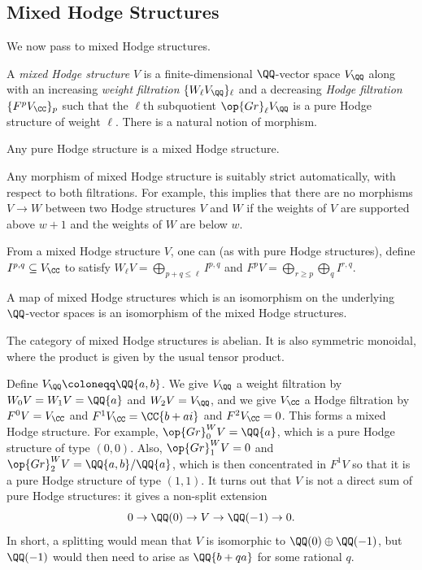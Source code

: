 \documentclass{article}
\begin{document}
\subsection{Mixed Hodge Structures}
We now pass to mixed Hodge structures.
\begin{definition}
	A \textit{mixed Hodge structure} $V$ is a finite-dimensional $\QQ$-vector space $V_\QQ$ along with an increasing \textit{weight filtration} $\{W_\ell V_\QQ\}_\ell$ and a decreasing \textit{Hodge filtration} $\{F^pV_\CC\}_p$ such that the $\ell$th subquotient $\op{Gr}_\ell V_\QQ$ is a pure Hodge structure of weight $\ell$. There is a natural notion of morphism.
\end{definition}
\begin{example}
	Any pure Hodge structure is a mixed Hodge structure.
\end{example}
\begin{remark}
	Any morphism of mixed Hodge structure is suitably strict automatically, with respect to both filtrations. For example, this implies that there are no morphisms $V\to W$ between two Hodge structures $V$ and $W$ if the weights of $V$ are supported above $w+1$ and the weights of $W$ are below $w$.
\end{remark}
\begin{remark}
	From a mixed Hodge structure $V$, one can (as with pure Hodge structures), define $I^{p,q}\subseteq V_\CC$ to satisfy $W_\ell V=\bigoplus_{p+q\le\ell}I^{p,q}$ and $F^pV=\bigoplus_{r\ge p}\bigoplus_qI^{r,q}$.
\end{remark}
\begin{remark}
	A map of mixed Hodge structures which is an isomorphism on the underlying $\QQ$-vector spaces is an isomorphism of the mixed Hodge structures.
\end{remark}
\begin{remark}
	The category of mixed Hodge structures is abelian. It is also symmetric monoidal, where the product is given by the usual tensor product.
\end{remark}
\begin{example}
	Define $V_\QQ\coloneqq\QQ\{a,b\}$. We give $V_\QQ$ a weight filtration by $W_0V=W_1V=\QQ\{a\}$ and $W_2V=V_\QQ$, and we give $V_\CC$ a Hodge filtration by $F^0V=V_\CC$ and $F^1V_\CC=\CC\{b+ai\}$ and $F^2V_\CC=0$. This forms a mixed Hodge structure. For example, $\op{Gr}_0^WV=\QQ\{a\}$, which is a pure Hodge structure of type $(0,0)$. Also, $\op{Gr}_1^WV=0$ and $\op{Gr}_2^WV=\QQ\{a,b\}/\QQ\{a\}$, which is then concentrated in $F^1V$ so that it is a pure Hodge structure of type $(1,1)$. It turns out that $V$ is not a direct sum of pure Hodge structures: it gives a non-split extension
	\[0\to\QQ(0)\to V\to\QQ(-1)\to0.\]
	In short, a splitting would mean that $V$ is isomorphic to $\QQ(0)\oplus\QQ(-1)$, but $\QQ(-1)$ would then need to arise as $\QQ\{b+qa\}$ for some rational $q$.
\end{example}
\end{document}

